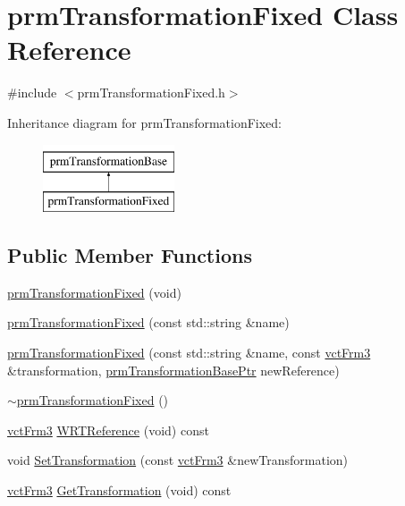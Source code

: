 \hypertarget{classprm_transformation_fixed}{}\section{prm\+Transformation\+Fixed Class Reference}
\label{classprm_transformation_fixed}


{\ttfamily \#include $<$prm\+Transformation\+Fixed.\+h$>$}

Inheritance diagram for prm\+Transformation\+Fixed\+:\begin{figure}[H]
\begin{center}
\leavevmode
\includegraphics[height=2.000000cm]{d7/de1/classprm_transformation_fixed}
\end{center}
\end{figure}
\subsection*{Public Member Functions}
\begin{DoxyCompactItemize}
\item 
\hyperlink{classprm_transformation_fixed_a7a92a2443e42386db2ee611900185b75}{prm\+Transformation\+Fixed} (void)
\item 
\hyperlink{classprm_transformation_fixed_adf82bb7f1bda64c4e07652e63096e6dc}{prm\+Transformation\+Fixed} (const std\+::string \&name)
\item 
\hyperlink{classprm_transformation_fixed_a849a52cbec6a8412dc45ac6f917fffe3}{prm\+Transformation\+Fixed} (const std\+::string \&name, const \hyperlink{vct_transformation_types_8h_a81feda0a02c2d1bc26e5553f409fed20}{vct\+Frm3} \&transformation, \hyperlink{prm_transformation_base_8h_a881a6a7d2191474974cdf36d79e1df08}{prm\+Transformation\+Base\+Ptr} new\+Reference)
\item 
\hyperlink{classprm_transformation_fixed_a92ca21365d151b6c648091a9ca5f2c0a}{$\sim$prm\+Transformation\+Fixed} ()
\item 
\hyperlink{vct_transformation_types_8h_a81feda0a02c2d1bc26e5553f409fed20}{vct\+Frm3} \hyperlink{classprm_transformation_fixed_a373e5383646b803690ef6f7efb888adb}{W\+R\+T\+Reference} (void) const 
\end{DoxyCompactItemize}
{\bf }\par
\begin{DoxyCompactItemize}
\item 
void \hyperlink{classprm_transformation_fixed_a1e058334176b1658769cedbf658d0a42}{Set\+Transformation} (const \hyperlink{vct_transformation_types_8h_a81feda0a02c2d1bc26e5553f409fed20}{vct\+Frm3} \&new\+Transformation)
\item 
\hyperlink{vct_transformation_types_8h_a81feda0a02c2d1bc26e5553f409fed20}{vct\+Frm3} \hyperlink{classprm_transformation_fixed_acab805f35892bf944ada402cd31c0545}{Get\+Transformation} (void) const 
\end{DoxyCompactItemize}


